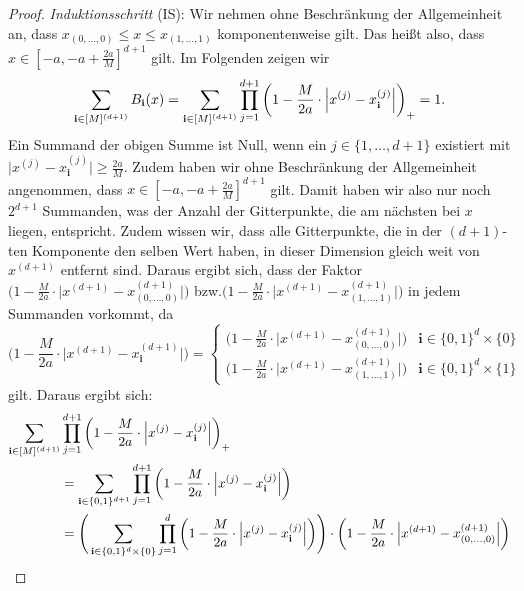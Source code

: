 \begin{proof}
\emph{Induktionsschritt} (IS): Wir nehmen ohne Beschränkung der Allgemeinheit an, dass $x_{(0,\dots,0)} \leq x \leq x_{(1,\dots,1)}$ komponentenweise gilt. Das heißt also, dass $x \in [-a, -a + \frac{2a}{M}]^{d + 1}$ gilt. Im Folgenden zeigen wir $$\sum_{\mathbf{i} \in [M]^{(d + 1)}} B_{\mathbf{i}}(x) = \sum_{\mathbf{i} \in [M]^{(d + 1)}}\prod_{j = 1}^{d + 1} \bigg(1 - \frac{M}{2a} \cdot \Big|x^{(j)} - x_{\mathbf{i}}^{(j)}\Big|\bigg)_+ = 1.$$
Ein Summand der obigen Summe ist Null, wenn ein $j \in \{1,\dots,d+1\}$ existiert mit $\big|x^{(j)} - x_{\mathbf{i}}^{(j)}\big| \geq \frac{2a}{M}$. Zudem haben wir ohne Beschränkung der Allgemeinheit angenommen, dass $x \in [-a, -a + \frac{2a}{M}]^{d + 1}$ gilt. Damit haben wir also nur noch $2^{d + 1}$ Summanden, was der Anzahl der Gitterpunkte, die am nächsten bei $x$ liegen, entspricht. Zudem wissen wir, dass alle Gitterpunkte, die in der $(d + 1)$-ten Komponente den selben Wert haben, in dieser Dimension gleich weit von $x^{(d + 1)}$ entfernt sind. Daraus ergibt sich, dass der Faktor $\big(1 - \frac{M}{2a} \cdot \big|x^{(d + 1)} - x_{(0,\dots,0)}^{(d + 1)}\big|\big)$ bzw.\@ $\big(1 - \frac{M}{2a} \cdot \big|x^{(d + 1)} - x_{(1,\dots,1)}^{(d + 1)}\big|\big)$ in jedem Summanden vorkommt, da 
\begin{equation*}
\Big(1 - \frac{M}{2a} \cdot \Big|x^{(d + 1)} - x_\mathbf{i}^{(d + 1)}\Big|\Big) = \begin{cases}
\Big(1 - \frac{M}{2a} \cdot \Big|x^{(d + 1)} - x_{(0,\dots,0)}^{(d + 1)}\Big|\Big) &\text{$\mathbf{i} \in \{0, 1\}^d \times \{0\}$}\\[0.5em]
\Big(1 - \frac{M}{2a} \cdot \Big|x^{(d + 1)} - x_{(1,\dots,1)}^{(d + 1)}\Big|\Big) &\text{$\mathbf{i} \in \{0, 1\}^d \times \{1\}$}
\end{cases}
\end{equation*}
gilt. Daraus ergibt sich:
\begin{equation*}
\begin{split}
\sum_{\bi \in [M]^{(d + 1)}} & \prod_{j = 1}^{d + 1} \bigg(1 - \frac{M}{2a} \cdot \Big|x^{(j)} - x_{\mathbf{i}}^{(j)}\Big|\bigg)_+ \\
& = \sum_{\mathbf{i} \in \{0, 1\}^{d + 1}} \prod_{j = 1}^{d + 1} \bigg(1 - \frac{M}{2a} \cdot \Big|x^{(j)} - x_{\bi}^{(j)}\Big|\bigg) \\
& = \Bigg(\sum_{\mathbf{i} \in \{0, 1\}^d \times \{0\}} \prod_{j = 1}^{d} \bigg(1 - \frac{M}{2a} \cdot \Big|x^{(j)} - x_{\bi}^{(j)}\Big|\bigg)\Bigg) \cdot \bigg(1 - \frac{M}{2a} \cdot \Big|x^{(d + 1)} - x_{(0,\dots,0)}^{(d + 1)}\Big|\bigg) \\

\end{split}
\end{equation*}
\end{proof}
